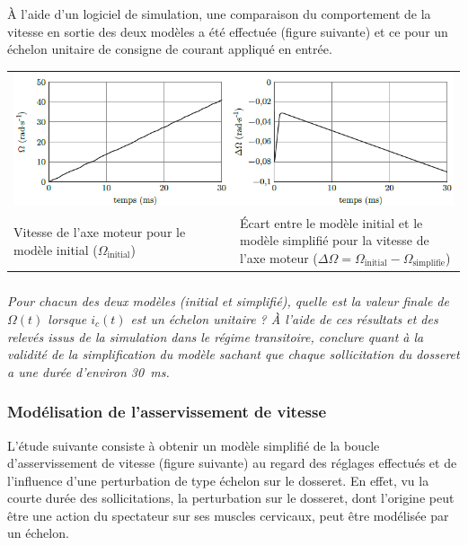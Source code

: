 \documentclass[10pt,fleqn]{article} %
\begin{document}
\begin{multicols}{2}
À l'aide d'un logiciel de simulation, une comparaison du comportement de la vitesse en sortie des deux modèles a été effectuée (figure suivante)%
 et ce pour un échelon unitaire de consigne de courant appliqué en entrée.

\begin{center}
\begin{tabular}{p{0.5\linewidth}p{0.5\linewidth}}
\multicolumn{2}{c}{\includegraphics[width=1.0\linewidth]{images/image13.png}}
\\
Vitesse de l'axe moteur pour le modèle initial ($\Omega_{\text{initial}}$)
&
Écart entre le modèle initial et le modèle simplifié pour la vitesse de l'axe moteur ($\Delta \Omega=\Omega_{\text{initial}}-\Omega_{\text{simplifie}}$)
\end{tabular}
\textit{ \label{fig12}}
\end{center}



\subparagraph{}\textit{Pour chacun des deux modèles (initial et simplifié), quelle est la
  valeur finale de $\Omega(t)$ lorsque $i_c(t)$ est un
  échelon unitaire ? À l'aide de ces résultats et des relevés issus de
  la simulation dans le régime transitoire, conclure quant à la validité
  de la simplification du modèle sachant que chaque sollicitation du
  dosseret a une durée d'environ \SI{30}{ms}.}





\subsubsection*{Modélisation de l'asservissement de vitesse}

L'étude suivante consiste à obtenir un modèle simplifié de la boucle
d'asservissement de vitesse (figure suivante) au regard des réglages effectués
et de l'influence d'une perturbation de type échelon sur le dosseret. En
effet, vu la courte durée des sollicitations, la perturbation sur le
dosseret, dont l'origine peut être une action du spectateur sur ses
muscles cervicaux, peut être modélisée par un échelon.


\end{multicols}
\end{document}
